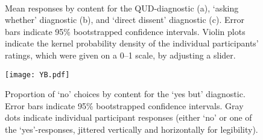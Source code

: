 \documentclass[11pt, a4paper]{article}
\begin{document}






\pagebreak

\begin{figure}[htbp]
  \vspace{-\baselineskip}
  \caption{Mean responses by content for the QUD-diagnostic (a), `asking whether' diagnostic (b), and `direct dissent' diagnostic (c). Error bars indicate 95\% bootstrapped confidence intervals. Violin plots indicate the kernel probability density of the individual participants’ ratings, which were given on a 0--1 scale, by adjusting a slider.} \label{fig:slider-ratings}

  \centering 
  \vspace{-.3\baselineskip}
    \\
    \vspace{-\baselineskip}

\end{figure}

\begin{figure}[htbp]
\vspace{-2\baselineskip}
  \caption{Proportion of ‘no’ choices by content for the `yes but' diagnostic. Error bars indicate 95\% bootstrapped confidence intervals. Gray dots indicate individual participant responses (either ‘no’ or one of the ‘yes’-responses, jittered vertically and horizontally for legibility).} \label{fig:yb}
  \vspace{-.5\baselineskip}
  \centering
  \texttt{[image: YB.pdf]}
\end{figure}
\end{document}
